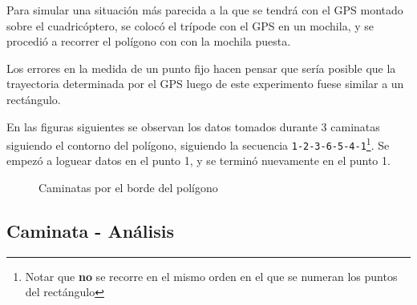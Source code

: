 \documentclass[main]{subfiles}
\begin{document}
Para simular una situación más parecida a la que se tendrá con el GPS montado sobre el cuadricóptero, se colocó el trípode con el GPS en un mochila, y se procedió a recorrer el polígono con con la mochila puesta.

Los errores en la medida de un punto fijo hacen pensar que sería posible que la trayectoria determinada por el GPS luego de este experimento fuese similar a un rectángulo.

En las figuras siguientes se observan los datos tomados durante 3 caminatas siguiendo el contorno del polígono, siguiendo la secuencia \verb+1-2-3-6-5-4-1+\footnote{Notar que \textbf{no} se recorre en el mismo orden en el que se numeran los puntos del rectángulo}. Se empezó a loguear datos en el punto 1, y se terminó nuevamente en el punto 1.

\begin{figure} [h!]
\vspace{-10pt}
  \centering
  \label{fig:caminatas}
\caption{Caminatas por el borde del polígono}
\vspace{-20pt}
\end{figure}

\newpage
\subsection{Caminata - Análisis}
\label{sec:caminata-analisis}
\end{document}
